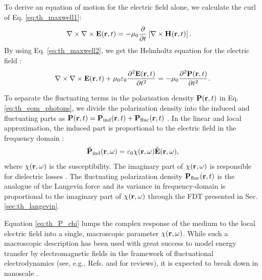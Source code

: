 To derive an equation of motion for the electric field alone, we calculate the curl of Eq. \eqref{eq:th_maxwell1}:
\begin{alignat}{2}
  \nabla \times \nabla \times \mathbf{E}(\mathbf{r},t) &= - \mu_0 \frac{\partial}{\partial t} \left[\nabla \times \mathbf{H}(\mathbf{r},t) \right] .
\end{alignat}
By using Eq. \eqref{eq:th_maxwell2}, we get the Helmholtz equation for the electric field \cite{novotny}:
\begin{equation}
   \nabla \times \nabla \times \bE(\br,t) + \mu_0 \varepsilon_0 \frac{\partial ^2\bb{E}(\br,t)}{\partial t^2}=  - \mu_0 \frac{\partial^2 \bb{P}(\br,t)}{\partial t^2}. \label{eq:th_eom_photons} %
\end{equation}

To separate the fluctuating terms in the polarization density $\mathbf{P}(\mathbf{r},t)$ in Eq. \eqref{eq:th_eom_photons}, we divide the polarization density into the induced and fluctuating parts as $\mathbf{P}(\mathbf{r},t)=\mathbf{P}_{\textrm{ind}}(\mathbf{r},t)+ \mathbf{P}_{\textrm{fluc}}(\mathbf{r},t)$ \cite{benabdallah11}. In the linear and local approximation, the induced part is proportional to the electric field in the frequency domain \cite{novotny}:
\begin{equation}
 \tilde{\mathbf{P}}_{\textrm{ind}}(\mathbf{r},\omega)= \varepsilon_0 \chi(\mathbf{r},\omega) \tilde{\mathbf{E}}(\mathbf{r},\omega), \label{eq:th_P_chi}
\end{equation}
where $\chi(\mathbf{r},\omega)$ is the susceptibility. The imaginary part of $\chi(\mathbf{r},\omega)$ is responsible for dielectric losses \cite{jackson}. The fluctuating polarization density $\mathbf{P}_{\textrm{fluc}}(\mathbf{r},t)$ is the analogue of the Langevin force and its variance in frequency-domain is proportional to the imaginary part of $\chi(\mathbf{r},\omega)$ through the FDT presented in Sec. \ref{sec:th_langevin}.

Equation \eqref{eq:th_P_chi} lumps the complex response of the medium to the local electric field into a single, macroscopic parameter $\chi(\mathbf{r},\omega)$. While such a macroscopic description has been used with great success to model energy transfer by electromagnetic fields in the framework of fluctuational electrodynamics \cite{rytov} (see, e.g., Refs. \cite{volokitin07} and \cite{joulain05} for reviews), it is expected to break down in nanoscale \cite{chalopin12b}. 

